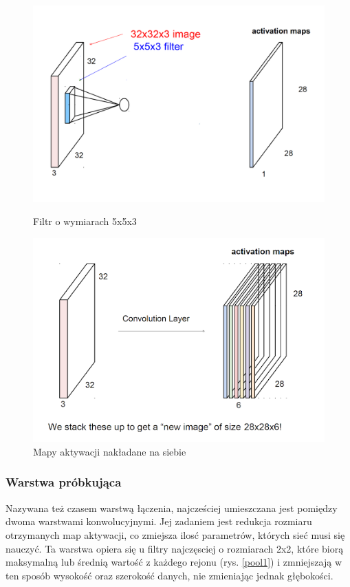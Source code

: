\documentclass[a4paper,twoside,12pt]{book}
\begin{document}
{\begin{figure}[h!]
\centering
\begin{minipage}{.5\textwidth}
  \centering
 \includegraphics[scale=0.20,left]{conv1.png}
  \caption{Filtr o wymiarach 5x5x3}
\label{conv1}
\end{minipage}%
\begin{minipage}{.5\textwidth}
  \centering
  \includegraphics[scale=0.3,right]{conv2.png}
  \caption{Mapy aktywacji nakładane na siebie}
  \label{conv2}
\end{minipage}
\end{figure}






\subsubsection{Warstwa próbkująca}
{Nazywana też czasem warstwą łączenia, najcześciej umieszczana jest pomiędzy dwoma warstwami konwolucyjnymi. Jej zadaniem jest redukcja rozmiaru otrzymanych map aktywacji, co zmiejsza ilosć parametrów, których sieć musi się nauczyć. Ta warstwa opiera się u filtry najczęsciej o rozmiarach 2x2, które biorą maksymalną lub średnią wartość z każdego rejonu (rys. \ref{pool1}) i zmniejszają w ten sposób wysokość oraz szerokość danych, nie zmieniając jednak głębokości.}

}
\end{document}
